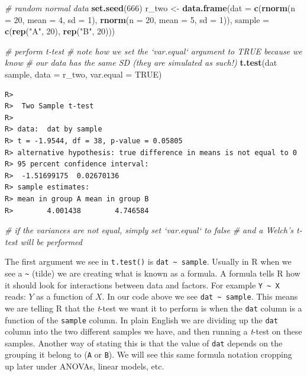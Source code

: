 \documentclass[english,10pt,a4paper,oneside]{book}
\newenvironment{Shaded}{\begin{snugshade}}{\end{snugshade}}
\newcommand{\CommentTok}[1]{\textcolor[rgb]{0.56,0.35,0.01}{\textit{#1}}}
\newcommand{\DataTypeTok}[1]{\textcolor[rgb]{0.13,0.29,0.53}{#1}}
\newcommand{\DecValTok}[1]{\textcolor[rgb]{0.00,0.00,0.81}{#1}}
\newcommand{\KeywordTok}[1]{\textcolor[rgb]{0.13,0.29,0.53}{\textbf{#1}}}
\newcommand{\NormalTok}[1]{#1}
\newcommand{\OperatorTok}[1]{\textcolor[rgb]{0.81,0.36,0.00}{\textbf{#1}}}
\newcommand{\OtherTok}[1]{\textcolor[rgb]{0.56,0.35,0.01}{#1}}
\newcommand{\StringTok}[1]{\textcolor[rgb]{0.31,0.60,0.02}{#1}}
\theoremstyle{definition}
\theoremstyle{definition}
\theoremstyle{definition}
\theoremstyle{remark}
\begin{document}
\begin{Shaded}
\begin{Highlighting}[]
\CommentTok{# random normal data}
\KeywordTok{set.seed}\NormalTok{(}\DecValTok{666}\NormalTok{)}
\NormalTok{r_two <-}\StringTok{ }\KeywordTok{data.frame}\NormalTok{(}\DataTypeTok{dat =} \KeywordTok{c}\NormalTok{(}\KeywordTok{rnorm}\NormalTok{(}\DataTypeTok{n =} \DecValTok{20}\NormalTok{, }\DataTypeTok{mean =} \DecValTok{4}\NormalTok{, }\DataTypeTok{sd =} \DecValTok{1}\NormalTok{),}
                            \KeywordTok{rnorm}\NormalTok{(}\DataTypeTok{n =} \DecValTok{20}\NormalTok{, }\DataTypeTok{mean =} \DecValTok{5}\NormalTok{, }\DataTypeTok{sd =} \DecValTok{1}\NormalTok{)),}
                    \DataTypeTok{sample =} \KeywordTok{c}\NormalTok{(}\KeywordTok{rep}\NormalTok{(}\StringTok{"A"}\NormalTok{, }\DecValTok{20}\NormalTok{), }\KeywordTok{rep}\NormalTok{(}\StringTok{"B"}\NormalTok{, }\DecValTok{20}\NormalTok{)))}

\CommentTok{# perform t-test}
\CommentTok{# note how we set the `var.equal` argument to TRUE because we know }
\CommentTok{# our data has the same SD (they are simulated as such!)}
\KeywordTok{t.test}\NormalTok{(dat }\OperatorTok{~}\StringTok{ }\NormalTok{sample, }\DataTypeTok{data =}\NormalTok{ r_two, }\DataTypeTok{var.equal =} \OtherTok{TRUE}\NormalTok{)}
\end{Highlighting}
\end{Shaded}

\begin{verbatim}
R> 
R>  Two Sample t-test
R> 
R> data:  dat by sample
R> t = -1.9544, df = 38, p-value = 0.05805
R> alternative hypothesis: true difference in means is not equal to 0
R> 95 percent confidence interval:
R>  -1.51699175  0.02670136
R> sample estimates:
R> mean in group A mean in group B 
R>        4.001438        4.746584
\end{verbatim}

\begin{Shaded}
\begin{Highlighting}[]
\CommentTok{# if the variances are not equal, simply set `var.equal` to false}
\CommentTok{# and a Welch's t-test will be performed}
\end{Highlighting}
\end{Shaded}

The first argument we see in \texttt{t.test()} is
\texttt{dat\ \textasciitilde{}\ sample}. Usually in R when we see a
\texttt{\textasciitilde{}} (tilde) we are creating what is known as a
formula. A formula tells R how it should look for interactions between
data and factors. For example \texttt{Y\ \textasciitilde{}\ X} reads:
\(Y\) as a function of \(X\). In our code above we see
\texttt{dat\ \textasciitilde{}\ sample}. This means we are telling R
that the \emph{t}-test we want it to perform is when the \texttt{dat}
column is a function of the \texttt{sample} column. In plain English we
are dividing up the \texttt{dat} column into the two different samples
we have, and then running a \emph{t}-test on these samples. Another way
of stating this is that the value of \texttt{dat} depends on the
grouping it belong to (\texttt{A} or \texttt{B}). We will see this same
formula notation cropping up later under ANOVAs, linear models, etc.
\end{document}
